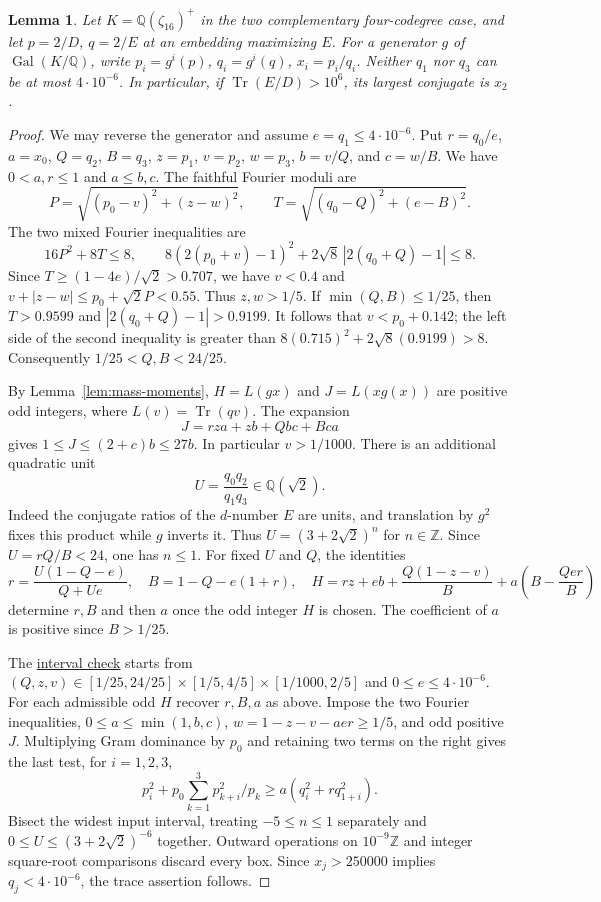 \documentclass[11pt,reqno]{amsart}
\newcommand{\codecheck}[2]{\href{https://github.com/sebastienpalcoux/grothendieck-ring-classification/blob/d5750105bb5758f3ad38d2e5464dfcc12c019816/supplements/rank6/sphericality/#1}{#2}}
\newtheorem{lemma}[theorem]{Lemma}
\theoremstyle{remark}\newtheorem{remark}[theorem]{Remark}
\numberwithin{equation}{section}
\begin{document}
\begin{lemma}\label{lem:cyclic16-small-adjacent}
Let $K=\mathbb Q(\zeta_{16})^+$ in the two complementary four-codegree
case, and let $p=2/D$, $q=2/E$ at an embedding maximizing $E$.
For a generator $g$ of $\operatorname{Gal}(K/\mathbb Q)$, write
$p_i=g^i(p)$, $q_i=g^i(q)$, $x_i=p_i/q_i$. Neither $q_1$ nor $q_3$
can be at most $4\cdot10^{-6}$. In particular, if
$\operatorname{Tr}(E/D)>10^6$, its largest conjugate is $x_2$.
\end{lemma}
\begin{proof}
We may reverse the generator and assume $e=q_1\le4\cdot10^{-6}$.
Put $r=q_0/e$, $a=x_0$, $Q=q_2$, $B=q_3$, $z=p_1$, $v=p_2$,
$w=p_3$, $b=v/Q$, and $c=w/B$. We have $0<a,r\le1$ and
$a\le b,c$. The faithful Fourier moduli are
\[
 P=\sqrt{(p_0-v)^2+(z-w)^2},\qquad
 T=\sqrt{(q_0-Q)^2+(e-B)^2}.
\]
The two mixed Fourier inequalities are
\[
 16P^2+8T\le8,\qquad
 8(2(p_0+v)-1)^2+2\sqrt8\,|2(q_0+Q)-1|\le8.
\]
Since $T\ge(1-4e)/\sqrt2>0.707$, we have
$v<0.4$ and $v+|z-w|\le p_0+\sqrt2 P<0.55$.
Thus $z,w>1/5$. If $\min(Q,B)\le1/25$, then
$T>0.9599$ and $|2(q_0+Q)-1|>0.9199$.
It follows that $v<p_0+0.142$; the left side of the second
inequality is greater than $8(0.715)^2+2\sqrt8(0.9199)>8$.
Consequently $1/25<Q,B<24/25$.

By Lemma~\ref{lem:mass-moments}, $H=L(gx)$ and $J=L(xg(x))$ are positive odd integers, where $L(v)=\operatorname{Tr}(qv)$.
The expansion
\[
  J=rza+zb+Qbc+Bca
\]
gives $1\le J\le(2+c)b\le27b$. In particular $v>1/1000$.
There is an additional quadratic unit
\[
    U=\frac{q_0q_2}{q_1q_3}\in\mathbb Q(\sqrt2).
\]
Indeed the conjugate ratios of the $d$-number $E$ are units,
and translation by $g^2$ fixes this product while $g$ inverts it.
Thus $U=(3+2\sqrt2)^n$ for $n\in\mathbb Z$. Since $U=rQ/B<24$,
one has $n\le1$. For fixed $U$ and $Q$, the identities
\[
 r=\frac{U(1-Q-e)}{Q+Ue},\quad
 B=1-Q-e(1+r),\quad
 H=rz+eb+\frac{Q(1-z-v)}{B}
       +a\left(B-\frac{Qer}{B}\right)
\]
determine $r,B$ and then $a$ once the odd integer $H$ is chosen.
The coefficient of $a$ is positive since $B>1/25$.

The \codecheck{field_checks/moments/adjacent16.cpp}{interval check}
starts from $(Q,z,v)\in[1/25,24/25]\times[1/5,4/5]\times[1/1000,2/5]$
and $0\le e\le4\cdot10^{-6}$. For each admissible odd $H$ recover
$r,B,a$ as above. Impose the two Fourier inequalities,
$0\le a\le\min(1,b,c)$, $w=1-z-v-aer\ge1/5$, and odd positive $J$.
Multiplying Gram dominance by $p_0$ and retaining two terms on the
right gives the last test, for $i=1,2,3$,
\[
 p_i^2+p_0\sum_{k=1}^3p_{k+i}^2/p_k\ge a(q_i^2+r q_{1+i}^2).
\]
Bisect the widest input interval, treating $-5\le n\le1$
separately and $0\le U\le(3+2\sqrt2)^{-6}$ together.
Outward operations on $10^{-9}\mathbb Z$ and integer square-root
comparisons discard every box. Since $x_j>250000$ implies
$q_j<4\cdot10^{-6}$, the trace assertion follows.
\end{proof}
\end{document}
